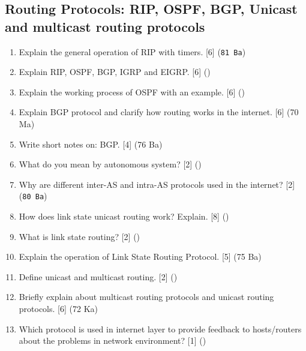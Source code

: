 \documentclass[12pt]{article}
\begin{document}
	\subsection{Routing Protocols: RIP, OSPF, BGP, Unicast and multicast routing protocols}
		\begin{enumerate}[noitemsep, topsep=0pt]
			\item Explain the general operation of RIP with timers. \hfill [6] (\texttt{81 Ba})

			\item Explain RIP, OSPF, BGP, IGRP and EIGRP. \hfill [6] ()

			\item Explain the working process of OSPF with an example. \hfill [6] ()

			\item Explain BGP protocol and clarify how routing works in the internet. \hfill [6] (70 Ma)

			\item Write short notes on: BGP. \hfill [4] (76 Ba)

			\item What do you mean by autonomous system? \hfill [2] ()
			
			\item Why are different inter-AS and intra-AS protocols used in the internet? \hfill [2] (\texttt{80 Ba})

			\item How does link state unicast routing work? Explain. \hfill [8] ()

			\item What is link state routing? \hfill [2] ()

			\item Explain the operation of Link State Routing Protocol. \hfill [5] (75 Ba)
			\item Define unicast and
			 multicast routing. \hfill [2] ()

			\item Briefly explain about multicast routing protocols and unicast routing protocols. \hfill [6] (72 Ka)

			\item Which protocol is used in internet layer to provide feedback to hosts/routers about the problems in network environment? \hfill [1] ()
		\end{enumerate}
\end{document}
